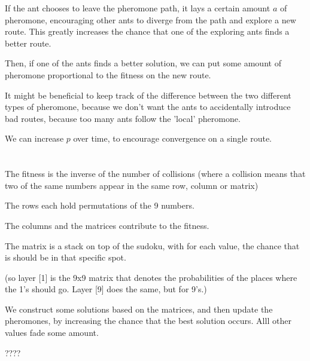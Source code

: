 \documentclass[11pt]{article}
\begin{document}
If the ant chooses to leave the pheromone path, it lays a certain amount $a$ of pheromone, encouraging other ants to diverge from the path and explore a new route. This greatly increases the chance that one of the exploring ants finds a better route.

Then, if one of the ants finds a better solution, we can put some amount of pheromone proportional to the fitness on the new route.

It might be beneficial to keep track of the difference between the two different types of pheromone, because we don't want the ants to accidentally introduce bad routes, because too many ants follow the 'local' pheromone.

We can increase $p$ over time, to encourage convergence on a single route. 


\section{}

The fitness is the inverse of the number of collisions (where a collision means that two of the same numbers appear in the same row, column or matrix)

The rows each hold permutations of the 9 numbers. 

The columns and the matrices contribute to the fitness.

The matrix is a stack on top of the sudoku, with for each value, the chance that is should be in that specific spot.

(so layer [1] is the 9x9 matrix that denotes the probabilities of the places where the 1's should go. Layer [9] does the same, but for 9's.)

We construct some solutions based on the matrices, and then update the pheromones, by increasing the chance that the best solution occurs. Alll other values fade some amount.

????
\end{document}
